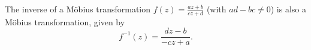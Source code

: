 The inverse of a Möbius transformation $f(z) = \frac{az+b}{cz+d}$ (with $ad-bc \neq 0$) is also a Möbius transformation, given by
$$f^{-1}(z) = \frac{dz - b}{-cz + a}.$$
